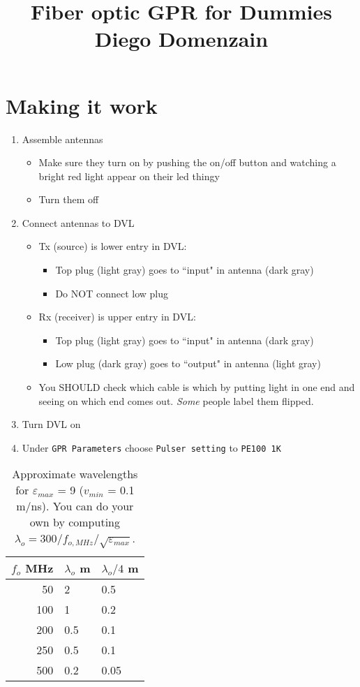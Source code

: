 \documentclass[a4paper,12pt]{article}
\title{Fiber optic GPR for Dummies\\{\normalsize Diego Domenzain}}
\author{}
\date{}
\begin{document}
\maketitle
\section*{Making it work}
\begin{enumerate}
\item Assemble antennas
\begin{itemize}
\item Make sure they turn on by pushing the on/off button and watching a bright red light appear on their led thingy
\item Turn them off
\end{itemize}
\item Connect antennas to DVL
\begin{itemize}
\item Tx (source) is lower entry in DVL:
\begin{itemize}
\item Top plug (light gray) goes to ``input" in antenna (dark gray)
\item Do NOT connect low plug
\end{itemize}
%
\item Rx (receiver) is upper entry in DVL:
\begin{itemize}
\item Top plug (light gray) goes to ``input" in antenna (dark gray)
\item Low plug (dark gray) goes to ``output" in antenna (light gray)
\end{itemize}
\item You SHOULD check which cable is which by putting light in one end and seeing on which end comes out. {\it Some} people label them flipped.
\end{itemize}
\item Turn DVL on
\item Under \texttt{GPR Parameters} choose \texttt{Pulser setting} to \texttt{PE100 1K}
\end{enumerate}
%
\begin{table}[!h]
\centering
\begin{tabular}{ r | l | l}
$f_o$ MHz & $\lambda_o$ m & $\lambda_o/4$ m \\
\hline
50 & 2 & 0.5 \\
100 & 1 & 0.2 \\
200 & 0.5 & 0.1 \\
250 & 0.5 & 0.1 \\
500 & 0.2 & 0.05 \\
\hline
\end{tabular}
\caption{Approximate wavelengths for $\varepsilon_{max}$ = 9 ($v_{min}$ = 0.1 m/ns). You can do your own by computing $\lambda_o=300/f_{o,MHz}/\sqrt{\varepsilon_{max}}$.}
 \label{tbl:wavelength}
 \end{table}
\end{document}
